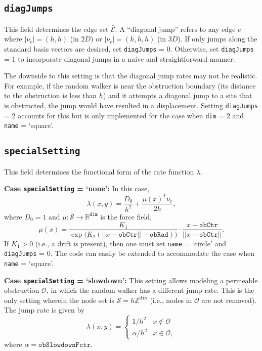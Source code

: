 \documentclass[11pt, oneside]{article}   	%
\theoremstyle{definition}
\newcommand{\real}{{\mathbb R}}
\newcommand\sS{\mathcal{S}}
\newcommand\sE{\mathcal{E}}
\newcommand{\integ}{{\mathbb Z}}
\newcommand\oS{\bar{\sS}}
\newcommand\oE{\bar{\sE}}
\begin{document}
\subsection{\texttt{diagJumps}}
This field determines the edge set $\oE$. A ``diagonal jump'' refers to any edge $e$ where $|\nu_e| = (h,h)$ (in $2D$) or $|\nu_e| = (h,h,h)$ (in $3D$). If only jumps along the standard basis vectors are desired, set \texttt{diagJumps} = 0. Otherwise, set \texttt{diagJumps} = 1 to incorporate diagonal jumps in a naive and straightforward manner.

The downside to this setting is that the diagonal jump rates may not be realistic. For example, if the random walker is near the obstruction boundary (its distance to the obstruction is less than $h$) and it attempts a diagonal jump to a site that is obstructed, the jump would have resulted in a displacement. Setting \texttt{diagJumps} = 2 accounts for this but is only implemented for the case when \texttt{dim} = 2 and \texttt{name} = `square'.

\subsection{\texttt{specialSetting}}
This field determines the functional form of the rate function $\lambda$.

{\bf Case \texttt{specialSetting} = `none':}
In this case,
\begin{equation}\label{eqn:rate-normal}
	\lambda(x,y) = \frac{D_0}{h^2} + \frac{\mu(x)^T \nu_e}{2h},
\end{equation}
where $D_0 = 1$ and $\mu: \oS \rightarrow \real^{\texttt{dim}}$ is the force field,
\begin{equation}\label{eqn:drift}
\mu(x) = \frac{K_1}{\exp\big(K_2(||x - \texttt{obCtr}|| - \texttt{obRad})\big)} \cdot \frac{x - \texttt{obCtr}}{||x - \texttt{obCtr}||}.
\end{equation}
If $K_1 > 0$ (i.e., a drift is present), then one must set \texttt{name} = `circle' and \texttt{diagJumps} = 0. The code can easily be extended to accommodate the case when \texttt{name} = `square'.

{\bf Case \texttt{specialSetting} = `slowdown':}
This setting allows modeling a permeable obstruction $\mathcal{O}$, in which the random walker has a different jump rate. This is the only setting wherein the node set is $\sS = h \integ^{\texttt{dim}}$ (i.e., nodes in $\mathcal{O}$ are not removed). The jump rate is given by
\begin{equation}\label{eqn:rate-slowdown}
\lambda(x,y) = 
	\begin{cases}
		1/h^2 & x \notin \mathcal{O} \\
		\alpha/h^2 & x \in \mathcal{O},
	\end{cases}
\end{equation}
where $\alpha = \texttt{obSlowdownFctr}$.
\end{document}
